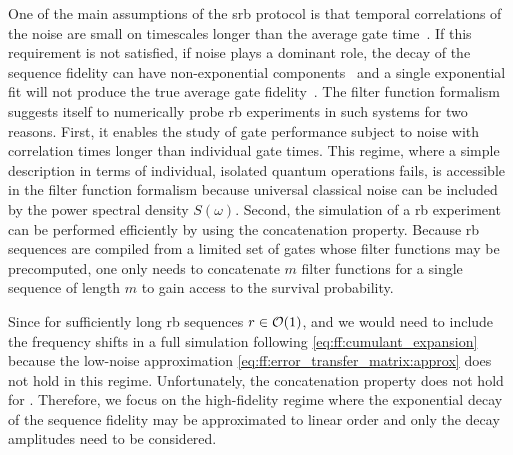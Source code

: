 One of the main assumptions of the \gls{srb} protocol is that temporal correlations of the noise are small on timescales longer than the average gate time~\cite{Magesan2011}.
If this requirement is not satisfied, \eg if \oneoverf noise plays a dominant role, the decay of the sequence fidelity can have non-exponential components~\cite{Epstein2014,Fogarty2015,Feng2016} and a single exponential fit will not produce the true average gate fidelity~\cite{Mavadia2018,Edmunds2020}.
The filter function formalism suggests itself to numerically probe \gls{rb} experiments in such systems for two reasons.
First, it enables the study of gate performance subject to noise with correlation times longer than individual gate times.
This regime, where a simple description in terms of individual, isolated quantum operations fails, is accessible in the filter function formalism because universal classical noise can be included by the power spectral density $S(\omega)$.
Second, the simulation of a \gls{rb} experiment can be performed efficiently by using the concatenation property.
Because \gls{rb} sequences are compiled from a limited set of gates whose filter functions may be precomputed, one only needs to concatenate $m$ filter functions for a single sequence of length $m$ to gain access to the survival probability.

Since for sufficiently long \gls{rb} sequences $r\in\order{1}$, and we would need to include the frequency shifts \freqshifts in a full simulation following \cref{eq:ff:cumulant_expansion} because the low-noise approximation \cref{eq:ff:error_transfer_matrix:approx} does not hold in this regime.
Unfortunately, the concatenation property does not hold for \freqshifts.
Therefore, we focus on the high-fidelity regime where the exponential decay of the sequence fidelity may be approximated to linear order and only the decay amplitudes \decayamps need to be considered.

